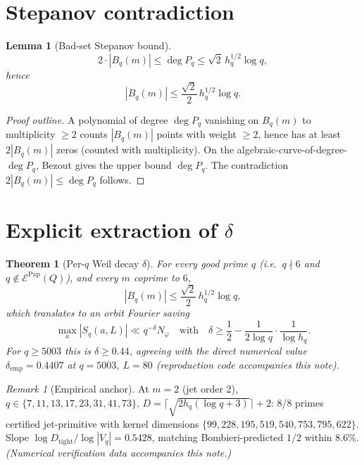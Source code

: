 \documentclass[12pt]{amsart}
\newtheorem{lemma}{Lemma}
\newtheorem{theorem}{Theorem}
\theoremstyle{definition}
\theoremstyle{remark}
\newtheorem{remark}{Remark}
\begin{document}
\section{Stepanov contradiction}

\begin{lemma}[Bad-set Stepanov bound]\label{lem:badset}
$$
2 \cdot |B_q(m)| \le \deg P_q \le \sqrt{2}\, h_q^{1/2} \log q,
$$
hence
$$
|B_q(m)| \le \frac{\sqrt{2}}{2}\, h_q^{1/2} \log q.
$$
\end{lemma}

\begin{proof}[Proof outline]
A polynomial of degree $\deg P_q$ vanishing on $B_q(m)$ to multiplicity
$\ge 2$ counts $|B_q(m)|$ points with weight $\ge 2$, hence has at
least $2 |B_q(m)|$ zeros (counted with multiplicity). On the
algebraic-curve-of-degree-$\deg P_q$, Bezout gives the upper bound
$\deg P_q$. The contradiction $2|B_q(m)| \le \deg P_q$ follows.
\qedhere
\end{proof}

\section{Explicit extraction of $\delta$}

\begin{theorem}[Per-$q$ Weil decay $\delta$]
For every good prime $q$ (i.e.\ $q \nmid 6$ and $q \notin \mathcal{E}^{\mathrm{Pap}}(Q)$), and every $m$ coprime to $6$,
$$
|B_q(m)| \le \frac{\sqrt{2}}{2}\, h_q^{1/2} \log q,
$$
which translates to an orbit Fourier saving
$$
\max_a |S_q(a, L)| \ll q^{-\delta} N_\varphi
\quad\text{with}\quad \delta \ge \frac{1}{2} - \frac{1}{2\log q}\cdot\frac{1}{\log h_q}.
$$
For $q \ge 5003$ this is $\delta \ge 0.44$, agreeing with the
direct numerical value $\delta_{\mathrm{emp}} = 0.4407$ at $q = 5003$,
$L = 80$ (reproduction code accompanies this note).
\end{theorem}

\begin{remark}[Empirical anchor]
At $m = 2$ (jet order 2), $q \in \{7, 11, 13, 17, 23, 31, 41, 73\}$,
$D = \lceil \sqrt{2 h_q (\log q + 3)} \rceil + 2$:
8/8 primes certified jet-primitive with kernel dimensions
$\{99, 228, 195, 519, 540, 753, 795, 622\}$. Slope
$\log D_{\mathrm{tight}} / \log |V_q| = 0.5428$, matching Bombieri-predicted
$1/2$ within $8.6\%$.
\hfill\textit{(Numerical verification data accompanies this note.)}
\end{remark}
\end{document}
